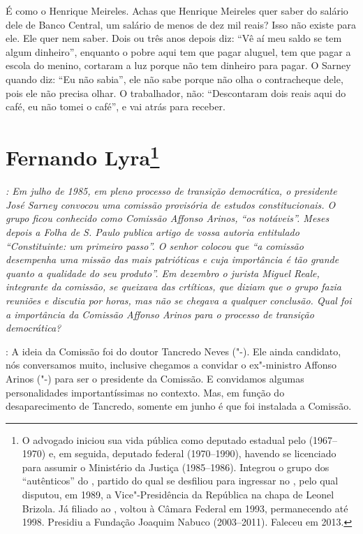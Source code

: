 É como o Henrique Meireles. Achas que Henrique Meireles quer saber do
salário dele de Banco Central, um salário de menos de dez mil reais?
Isso não existe para ele. Ele quer nem saber. Dois ou três anos depois
diz: ``Vê aí meu saldo se tem algum dinheiro'', enquanto o pobre aqui tem
que pagar aluguel, tem que pagar a escola do menino, cortaram a luz
porque não tem dinheiro para pagar. O Sarney quando diz: ``Eu não sabia'',
ele não sabe porque não olha o contracheque dele, pois ele não precisa
olhar. O trabalhador, não: ``Descontaram dois reais aqui do café, eu não
tomei o café'', e vai atrás para receber.

\chapter{Fernando Lyra\footnote{O advogado iniciou sua vida pública como deputado estadual pelo 
(1967--1970) e, em seguida, deputado federal (1970--1990), havendo se
licenciado para assumir o Ministério da Justiça (1985--1986). Integrou o
grupo dos ``autênticos'' do , partido do qual se desfiliou para
ingressar no , pelo qual disputou, em 1989, a Vice"-Presidência da
República na chapa de Leonel Brizola. Já filiado ao , voltou à Câmara
Federal em 1993, permanecendo até 1998. Presidiu a Fundação Joaquim
Nabuco (2003--2011). Faleceu em 2013.}}

\emph{: Em julho de 1985, em pleno processo de transição democrática, o
presidente José Sarney convocou uma comissão provisória de estudos
constitucionais. O grupo ficou conhecido como Comissão Affonso Arinos,
``os notáveis''. Meses depois a \emph{Folha de S. Paulo} publica artigo de
vossa autoria entitulado ``Constituinte: um primeiro passo''. O senhor
colocou que ``a comissão desempenha uma missão das mais patrióticas e
cuja importância é tão grande quanto a qualidade do seu produto''. Em
dezembro o jurista Miguel Reale, integrante da comissão, se queixava das
crtíticas, que diziam que o grupo fazia reuniões e discutia por horas,
mas não se chegava a qualquer conclusão. Qual foi a importância da
Comissão Affonso Arinos para o processo de transição democrática?}

: A ideia da Comissão foi do doutor Tancredo Neves
("-). Ele ainda candidato, nós conversamos muito, inclusive
chegamos a convidar o ex"-ministro Affonso Arinos ("-) para ser o
presidente da Comissão. E convidamos algumas personalidades
importantíssimas no contexto. Mas, em função do desaparecimento de
Tancredo, somente em junho é que foi instalada a Comissão.

